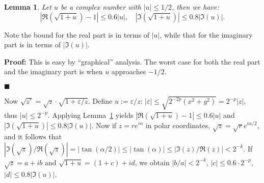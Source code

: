 \documentclass [11pt]{article}
\renewcommand {\epsilon}{\varepsilon}
\newtheorem{lemma}[theorem]{Lemma}
\newenvironment{proof}{\noindent \textbf {Proof:}}{{\hspace* {\fill}$\blacksquare$}}
\begin{document}
\begin{lemma} \label{lem:sqrtaux}
  Let $u$ be a complex number with $|u| \le 1/2$, then we have:
  \[ |\Re(\sqrt{1+u})-1| \le 0.6 |u|, \quad |\Im(\sqrt{1+u})| \le 0.8 |\Im(u)|. \]
\end{lemma}
Note the bound for the real part is in terms of $|u|$, while that for the imaginary
part is in terms of $|\Im(u)|$.

\begin{proof}
  This is easy by ``graphical'' analysis. The worst case for both the real part
  and the imaginary part is when $u$ approaches $-1/2$.
\begin{comment}
sage: k=7; r=1/2
sage: for j in [0..2*k]:
....:     z=n(r*exp(i*j*pi/k))
....:     print(j,z,abs(real(sqrt(1+z)-1))/abs(z))
0 0.500000000000000 0.449489742783178
1 0.450484433951210 + 0.216941869558779*I 0.415409947736925
2 0.311744900929367 + 0.390915741234015*I 0.315383224097579
3 0.111260466978157 + 0.487463956090912*I 0.156263064927417
4 -0.111260466978157 + 0.487463956090912*I 0.0494175466565054
5 -0.311744900929367 + 0.390915741234015*I 0.279663363756074
6 -0.450484433951210 + 0.216941869558779*I 0.489831708673434
7 -0.500000000000000 0.585786437626905
8 -0.450484433951210 - 0.216941869558779*I 0.489831708673434
9 -0.311744900929367 - 0.390915741234015*I 0.279663363756075
10 -0.111260466978157 - 0.487463956090912*I 0.0494175466565054
11 0.111260466978157 - 0.487463956090912*I 0.156263064927417
12 0.311744900929367 - 0.390915741234015*I 0.315383224097579
13 0.450484433951210 - 0.216941869558779*I 0.415409947736925
14 0.500000000000000 0.449489742783178
sage: k=1001
sage: for j in [1..k-1]:
....:     z=n(r*exp(i*j*pi/k))
....:     print(j,z,abs(imag(sqrt(1+z)))/abs(imag(z)))
...
1000 -0.499997537528331 + 0.00156922452357623*I 0.707104169363970
\end{comment}
\end{proof}

Now $\sqrt{z'} = \sqrt{z} \cdot \sqrt{1+\epsilon/z}$.
Define $u := \epsilon/z$:
$|\epsilon| \le \sqrt{2^{-2p} (x^2 + y^2)} = 2^{-p} |z|$,
thus $|u| \le 2^{-p}$.
Applying Lemma~\ref{lem:sqrtaux}
yields $|\Re(\sqrt{1+u})-1| \le 0.6 |u|$ and
$|\Im(\sqrt{1+u})| \le 0.8 |\Im(u)|$.
Now if $z = r e^{i\alpha}$ in polar coordinates,
$\sqrt{z} = \sqrt{r} e^{i\alpha/2}$, and it follows that
$|\Im(\sqrt{z})/\Re(\sqrt{z})| = |\tan(\alpha/2)| \le |\tan(\alpha)|
\le |\Im(z)/\Re(z)| < 2^{-k}$.
If $\sqrt{z} = a+ib$ and $\sqrt{1+u} = (1+c)+id$, we obtain
$|b/a| < 2^{-k}$, $|c| \le 0.6 \cdot 2^{-p}$, $|d| \le 0.8 |\Im(u)|$.
\end{document}
